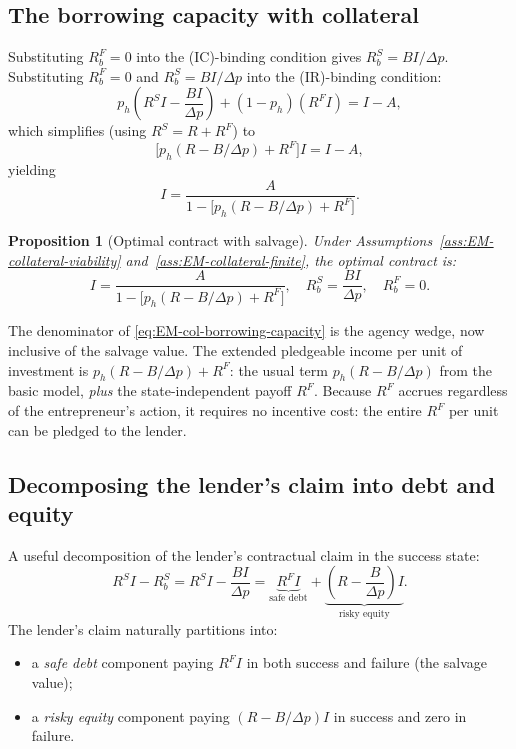 \documentclass[11pt,a4paper,oneside]{book}
\theoremstyle{plain}
\newtheorem{proposition}[theorem]{Proposition}
\theoremstyle{definition}
\theoremstyle{remark}
\numberwithin{equation}{chapter}
\begin{document}
\subsection{The borrowing capacity with collateral}

Substituting $R_b^F = 0$ into the (IC)-binding condition gives $R_b^S = B I / \Delta p$.
Substituting $R_b^F = 0$ and $R_b^S = B I / \Delta p$ into the (IR)-binding condition:
\begin{equation*}
  p_h \left( R^S I - \frac{B I}{\Delta p} \right) + (1 - p_h)(R^F I) = I - A,
\end{equation*}
which simplifies (using $R^S = R + R^F$) to
\begin{equation}\label{eq:EM-col-IR-simplified}
  \bigl[ p_h(R - B/\Delta p) + R^F \bigr] I = I - A,
\end{equation}
yielding
\begin{equation}\label{eq:EM-col-borrowing-capacity}
  I = \frac{A}{1 - \bigl[ p_h(R - B/\Delta p) + R^F \bigr]}.
\end{equation}

\begin{proposition}[Optimal contract with salvage]\label{prop:EM-col-contract}
Under Assumptions~\ref{ass:EM-collateral-viability} and~\ref{ass:EM-collateral-finite}, the optimal contract is:
\begin{equation*}
  I = \frac{A}{1 - \bigl[ p_h(R - B/\Delta p) + R^F \bigr]},
  \quad
  R_b^S = \frac{B I}{\Delta p},
  \quad
  R_b^F = 0.
\end{equation*}
\end{proposition}

The denominator of \eqref{eq:EM-col-borrowing-capacity} is the agency wedge, now inclusive of the salvage value.
The extended pledgeable income per unit of investment is $p_h(R - B/\Delta p) + R^F$: the usual term $p_h(R - B/\Delta p)$ from the basic model, \emph{plus} the state-independent payoff $R^F$.
Because $R^F$ accrues regardless of the entrepreneur's action, it requires no incentive cost: the entire $R^F$ per unit can be pledged to the lender.

\subsection{Decomposing the lender's claim into debt and equity}

A useful decomposition of the lender's contractual claim in the success state:
\begin{equation*}
  R^S I - R_b^S = R^S I - \frac{B I}{\Delta p}
  = \underbrace{R^F I}_{\text{safe debt}} + \underbrace{\left(R - \frac{B}{\Delta p}\right) I}_{\text{risky equity}}.
\end{equation*}
The lender's claim naturally partitions into:
\begin{itemize}
  \item a \emph{safe debt} component paying $R^F I$ in both success and failure (the salvage value);
  \item a \emph{risky equity} component paying $(R - B/\Delta p) I$ in success and zero in failure.
\end{itemize}
\end{document}
